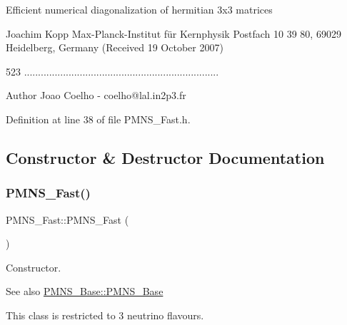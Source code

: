 \begin{DoxyPre}     Efficient numerical diagonalization of hermitian 3x3 matrices\end{DoxyPre}



\begin{DoxyPre}                            Joachim Kopp
                  Max-Planck-Institut für Kernphysik 
             Postfach 10 39 80, 69029 Heidelberg, Germany
                    (Received 19 October 2007)\end{DoxyPre}



\begin{DoxyPre}                                523
......................................................................
 \end{DoxyPre}


\begin{DoxyAuthor}{Author}
Joao Coelho -\/ coelho@lal.\+in2p3.\+fr 
\end{DoxyAuthor}


Definition at line 38 of file P\+M\+N\+S\+\_\+\+Fast.\+h.



\subsection{Constructor \& Destructor Documentation}
\mbox{\label{classOscProb_1_1PMNS__Fast_a2bbac744bf63753105d766a860af7c0d}} 
\subsubsection{\texorpdfstring{P\+M\+N\+S\+\_\+\+Fast()}{PMNS\_Fast()}}
{\footnotesize\ttfamily P\+M\+N\+S\+\_\+\+Fast\+::\+P\+M\+N\+S\+\_\+\+Fast (\begin{DoxyParamCaption}{ }\end{DoxyParamCaption})}

Constructor. \begin{DoxySeeAlso}{See also}
\hyperlink{classOscProb_1_1PMNS__Base_aa53e83b03a9cf4bdfa0a07136bd17a79}{P\+M\+N\+S\+\_\+\+Base\+::\+P\+M\+N\+S\+\_\+\+Base}
\end{DoxySeeAlso}
This class is restricted to 3 neutrino flavours. 

